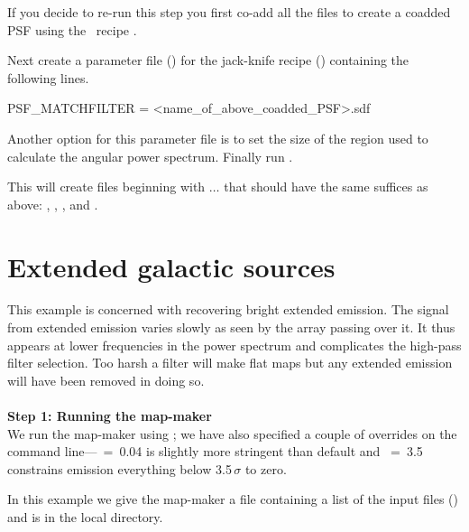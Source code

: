 \documentclass[11pt,oneside,chapters]{starlink}
\begin{document}
If you decide to re-run this step you first co-add all the
 files to create a coadded PSF using the \picard\ recipe
.
\begin{terminalv}
\end{terminalv}
Next create a parameter file () for the jack-knife
recipe () containing the following lines.
\begin{terminalv}
PSF_MATCHFILTER = <name_of_above_coadded_PSF>.sdf
\end{terminalv}
Another option for this parameter file is  to set the
size of the region used to calculate the angular power spectrum.
Finally run .
\begin{terminalv}
\end{terminalv}
This will create files beginning with $\ldots$ that
should have the same suffices as above: ,
, , and .



\section{Extended galactic sources}
\label{sec:bright_ex}

This example is concerned with recovering bright extended emission.
The signal from extended emission varies slowly as seen by the array
passing over it. It thus appears at lower frequencies in the power
spectrum and complicates the high-pass filter selection. Too harsh a
filter will make flat maps but any extended emission will have been
removed in doing so.
\\ \\
\textbf{Step 1: Running the map-maker}
\vspace{0.2cm}\\
We run the map-maker using ;
we have also specified a couple of overrides on the command
line---~=~0.04 is slightly more stringent than default and
~=~3.5 constrains emission everything below
3.5\,$\sigma$ to zero.

In this example we give the map-maker a file containing a list of the
input files () and
 is in the local directory.
\end{document}
